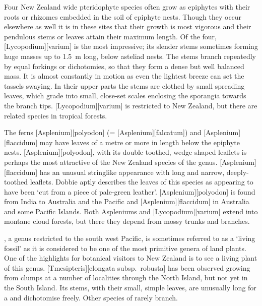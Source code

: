 Four New Zealand wide pteridophyte species often grow as epiphytes with their roots or rhizomes embedded in the soil of epiphyte nests.
Though they occur elsewhere as well it is in these sites that their growth is most vigorous and their pendulous stems or leaves attain their maximum length.
Of the four, [Lycopodium][varium] is the most impressive; its slender stems sometimes forming huge masses up to \SI{1.5}{\metre} long, below asteliad nests.
The stems branch repeatedly by equal forkings or dichotomies, so that they form a dense but well balanced mass.
It is almost constantly in motion as even the lightest breeze can set the tassels swaying.
In their upper parts the stems are clothed by small spreading leaves, which grade into small, close-set scales enclosing the sporangia towards the branch tips. [Lycopodium][varium] is restricted to New Zealand, but there are related species in tropical forests.

The ferns [Asplenium][polyodon] (= [Asplenium][falcatum]) and [Asplenium][flaccidum] may have leaves of a metre or more in length below the epiphyte nests. [Asplenium][polyodon], with its double-toothed, wedge-shaped leaflets is perhaps the most attractive of the New Zealand species of the genus. [Asplenium][flaccidum] has an unusual stringlike appearance with long and narrow, deeply-toothed leaflets.
Dobbie aptly describes the leaves of this species as appearing to have been `cut from a piece of pale-green leather'. [Asplenium][polyodon] is found from India to Australia and the Pacific and [Asplenium][flaccidum] in Australia and some Pacific Islands.
Both Aspleniums and [Lycopodium][varium] extend into montane cloud forests, but there they depend from mossy trunks and branches.

, a genus restricted to the south west Pacific, is sometimes referred to as a `living fossil' as it is considered to be one of the most primitive genera of land plants.
One of the highlights for botanical visitors to New Zealand is to see a living plant of this genus. [Tmesipteris][elongata subsp.\ robusta] has been observed growing from  clumps at a number of localities through the North Island, but not yet in the South Island.
Its stems, with their small, simple leaves, are unusually long for a  and dichotomise freely.
Other species of  rarely branch.

